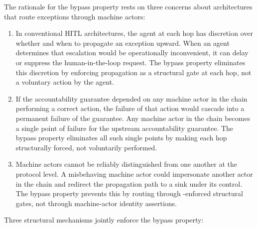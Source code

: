 The rationale for the bypass property rests on three concerns about architectures that route exceptions through machine actors:

\begin{enumerate}\itemsep=0pt
\item[$\mathbf{C1\colon}$ \textbf{Deferral vulnerability.}] In conventional HITL architectures, the agent at each hop has discretion over whether and when to propagate an exception upward. When an agent determines that escalation would be operationally inconvenient, it can delay or suppress the human-in-the-loop request. The bypass property eliminates this discretion by enforcing propagation as a structural gate at each hop, not a voluntary action by the agent.

\item[$\mathbf{C2\colon}$ \textbf{Single points of failure.}] If the accountability guarantee depended on any machine actor in the chain performing a correct action, the failure of that action would cascade into a permanent failure of the guarantee. Any machine actor in the chain becomes a single point of failure for the upstream accountability guarantee. The bypass property eliminates all such single points by making each hop structurally forced, not voluntarily performed.

\item[$\mathbf{C3\colon}$ \textbf{Credential substitution.}] Machine actors cannot be reliably distinguished from one another at the protocol level. A misbehaving machine actor could impersonate another actor in the chain and redirect the propagation path to a sink under its control. The bypass property prevents this by routing through \fact{}-enforced structural gates, not through machine-actor identity assertions.
\end{enumerate}

Three structural mechanisms jointly enforce the bypass property:

